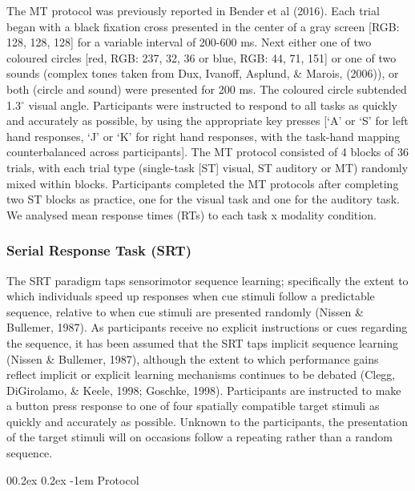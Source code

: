 \documentclass[
  man]{apa6}
\makeatletter
\let\oldparagraph\paragraph
\renewcommand{\paragraph}[1]{\oldparagraph{#1}\mbox{}}
\renewcommand{\paragraph}{\@startsection{paragraph}{4}{\parindent}%
  {0\baselineskip \@plus 0.2ex \@minus 0.2ex}%
  {-1em}%
  {\normalfont\normalsize\bfseries\itshape\typesectitle}}
\makeatother
\begin{document}
The MT protocol was previously reported in Bender et al (2016). Each trial began with a black fixation cross presented in the center of a gray screen {[}RGB: 128, 128, 128{]} for a variable interval of 200-600 ms. Next either one of two coloured circles {[}red, RGB: 237, 32, 36 or blue, RGB: 44, 71, 151{]} or one of two sounds (complex tones taken from Dux, Ivanoff, Asplund, \& Marois, (2006)), or both (circle and sound) were presented for 200 ms. The coloured circle subtended 1.3\(^\circ\) visual angle. Participants were instructed to respond to all tasks as quickly and accurately as possible, by using the appropriate key presses {[}`A' or `S' for left hand responses, `J' or `K' for right hand responses, with the task-hand mapping counterbalanced across participants{]}. The MT protocol consisted of 4 blocks of 36 trials, with each trial type (single-task {[}ST{]} visual, ST auditory or MT) randomly mixed within blocks. Participants completed the MT protocols after completing two ST blocks as practice, one for the visual task and one for the auditory task. We analysed mean response times (RTs) to each task x modality condition.

\hypertarget{serial-response-task-srt}{%
\subsubsection{Serial Response Task (SRT)}\label{serial-response-task-srt}}

\label{sec:SRTMeth}

The SRT paradigm taps sensorimotor sequence learning; specifically the extent to which individuals speed up responses when cue stimuli follow a predictable sequence, relative to when cue stimuli are presented randomly (Nissen \& Bullemer, 1987). As participants receive no explicit instructions or cues regarding the sequence, it has been assumed that the SRT taps implicit sequence learning (Nissen \& Bullemer, 1987), although the extent to which performance gains reflect implicit or explicit learning mechanisms continues to be debated (Clegg, DiGirolamo, \& Keele, 1998; Goschke, 1998). Participants are instructed to make a button press response to one of four spatially compatible target stimuli as quickly and accurately as possible. Unknown to the participants, the presentation of the target stimuli will on occasions follow a repeating rather than a random sequence.

\hypertarget{protocol-2}{%
\paragraph{Protocol}\label{protocol-2}}
\end{document}
